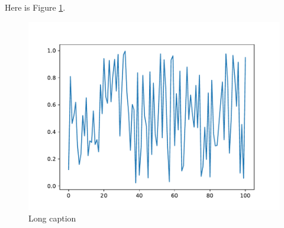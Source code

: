 \documentclass[../main.tex]{subfiles}
\begin{document}
Here is Figure \ref{ch2:fig:figure1}.

\begin{figure}[t]
    \includegraphics[width=12cm]{"Figure_1"}

	\caption[Short caption]{Long caption}

	\label{ch2:fig:figure1}
\end{figure}
\end{document}
